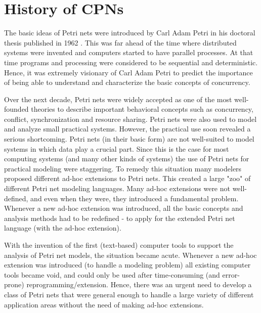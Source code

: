 \section{History of CPNs}

The basic ideas of Petri nets were introduced by Carl Adam Petri in
his doctoral thesis published in 1962 \cite{capetri:thesis}. This was
far ahead of the time where distributed systems were invented and
computers started to have parallel processes. At that time programs
and processing were considered to be sequential and
deterministic. Hence, it was extremely visionary of Carl Adam Petri to
predict the importance of being able to understand and characterize
the basic concepts of concurrency.

Over the next decade, Petri nets were widely accepted as one of the
most well-founded theories to describe important behavioral concepts
such as concurrency, conflict, synchronization and resource
sharing. Petri nets were also used to model and analyze small
practical systems. However, the practical use soon revealed a serious
shortcoming. Petri nets (in their basic form) are not well-suited to
model systems in which data play a crucial part. Since this is the
case for most computing systems (and many other kinds of systems) the
use of Petri nets for practical modeling were staggering. To remedy
this situation many modelers proposed different ad-hoc extensions to
Petri nets. This created a large "zoo" of different Petri net modeling
languages. Many ad-hoc extensions were not well-defined, and even when
they were, they introduced a fundamental problem. Whenever a new
ad-hoc extension was introduced, all the basic concepts and analysis
methods had to be redefined - to apply for the extended Petri net
language (with the ad-hoc extension).

With the invention of the first (text-based) computer tools to support
the analysis of Petri net models, the situation became acute. Whenever
a new ad-hoc extension was introduced (to handle a modeling problem)
all existing computer tools became void, and could only be used after
time-consuming (and error-prone) reprogramming/extension. Hence, there
was an urgent need to develop a class of Petri nets that were general
enough to handle a large variety of different application areas
without the need of making ad-hoc extensions.

